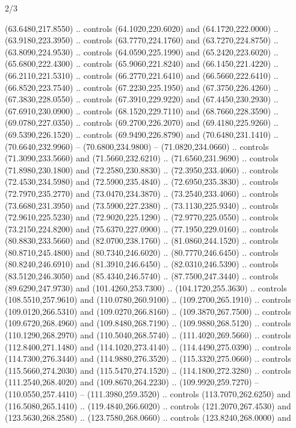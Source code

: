 \begin{flagdescription}{2/3}
\begin{scope}[xshift=0.5\flaglength,yshift=0.5\flagwidth,scale=\stretchfactor]
\begin{scope}[scale=0.001645\flagwidth,yshift=65mm,xshift=-63mm]
\begin{scope}[y=0.80pt, x=0.80pt, yscale=-1,]
\begin{scope}[cm={{1.33333,0.0,0.0,1.33333,(0.0,1e-05)}}]
  (63.6480,217.8550) .. controls (64.1020,220.6020) and (64.1720,222.0000) ..
  (63.9180,223.3950) .. controls (63.7770,224.1760) and (63.7270,224.8750) ..
  (63.8090,224.9530) .. controls (64.0590,225.1990) and (65.2420,223.6020) ..
  (65.6800,222.4300) .. controls (65.9060,221.8240) and (66.1450,221.4220) ..
  (66.2110,221.5310) .. controls (66.2770,221.6410) and (66.5660,222.6410) ..
  (66.8520,223.7540) .. controls (67.2230,225.1950) and (67.3750,226.4260) ..
  (67.3830,228.0550) .. controls (67.3910,229.9220) and (67.4450,230.2930) ..
  (67.6910,230.0900) .. controls (68.1520,229.7110) and (68.7660,228.3590) ..
  (69.0780,227.0350) .. controls (69.2700,226.2070) and (69.4180,225.9260) ..
  (69.5390,226.1520) .. controls (69.9490,226.8790) and (70.6480,231.1410) ..
  (70.6640,232.9960) -- (70.6800,234.9800) -- (71.0820,234.0660) .. controls
  (71.3090,233.5660) and (71.5660,232.6210) .. (71.6560,231.9690) .. controls
  (71.8980,230.1800) and (72.2580,230.8830) .. (72.3950,233.4060) .. controls
  (72.4530,234.5980) and (72.5900,235.4840) .. (72.6950,235.3830) .. controls
  (72.7970,235.2770) and (73.0470,234.3870) .. (73.2540,233.4060) .. controls
  (73.6680,231.3950) and (73.5900,227.2380) .. (73.1130,225.9340) .. controls
  (72.9610,225.5230) and (72.9020,225.1290) .. (72.9770,225.0550) .. controls
  (73.2150,224.8200) and (75.6370,227.0900) .. (77.1950,229.0160) .. controls
  (80.8830,233.5660) and (82.0700,238.1760) .. (81.0860,244.1520) .. controls
  (80.8710,245.4800) and (80.7340,246.6020) .. (80.7770,246.6450) .. controls
  (80.8240,246.6910) and (81.3910,246.6450) .. (82.0310,246.5390) .. controls
  (83.5120,246.3050) and (85.4340,246.5740) .. (87.7500,247.3440) .. controls
  (89.6290,247.9730) and (101.4260,253.7300) .. (104.1720,255.3630) .. controls
  (108.5510,257.9610) and (110.0780,260.9100) .. (109.2700,265.1910) .. controls
  (109.0120,266.5310) and (109.0270,266.8160) .. (109.3870,267.7500) .. controls
  (109.6720,268.4960) and (109.8480,268.7190) .. (109.9880,268.5120) .. controls
  (110.1290,268.2970) and (110.5040,268.5740) .. (111.4020,269.5660) .. controls
  (112.8400,271.1480) and (114.1020,273.4140) .. (114.4490,275.0390) .. controls
  (114.7300,276.3440) and (114.9880,276.3520) .. (115.3320,275.0660) .. controls
  (115.5660,274.2030) and (115.5470,274.1520) .. (114.1800,272.3280) .. controls
  (111.2540,268.4020) and (109.8670,264.2230) .. (109.9920,259.7270) --
  (110.0550,257.4410) -- (111.3980,259.3520) .. controls (113.7070,262.6250) and
  (116.5080,265.1410) .. (119.4840,266.6020) .. controls (121.2070,267.4530) and
  (123.5630,268.2580) .. (123.7580,268.0660) .. controls (123.8240,268.0000) and

\end{scope}
\end{scope}
\end{scope}
\end{scope}
\end{flagdescription}
